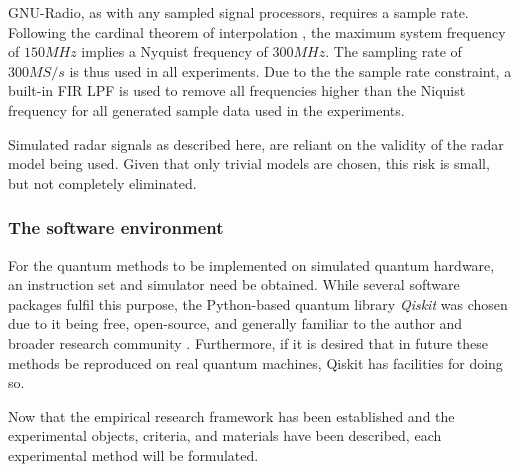 GNU-Radio, as with any sampled signal processors, requires a sample rate.
Following the cardinal theorem of interpolation \cite{nyquist_certain_1928}, the maximum system frequency of \(150MHz\) implies a Nyquist frequency of \(300MHz\).
The sampling rate of \(300MS/s\) is thus used in all experiments.
Due to the the sample rate constraint, a built-in \ac{FIR} \ac{LPF} is used to remove all frequencies higher than the Niquist frequency for all generated sample data used in the experiments.

Simulated radar signals as described here, are reliant on the validity of the radar model being used.
Given that only trivial models are chosen, this risk is small, but not completely eliminated.

\subsubsection{The software environment}

For the quantum methods to be implemented on simulated quantum hardware, an instruction set and simulator need be obtained. 
While several software packages fulfil this purpose, the Python-based quantum library \textit{Qiskit} \cite{qiskit_contributors_qiskit_2023} was chosen due to it being free, open-source, and generally familiar to the author and broader research community \cite{garhwal_quantum_2021}.
Furthermore, if it is desired that in future these methods be reproduced on real quantum machines, Qiskit has facilities for doing so.

Now that the empirical research framework has been established and the experimental objects, criteria, and materials have been described, each experimental method will be formulated.
